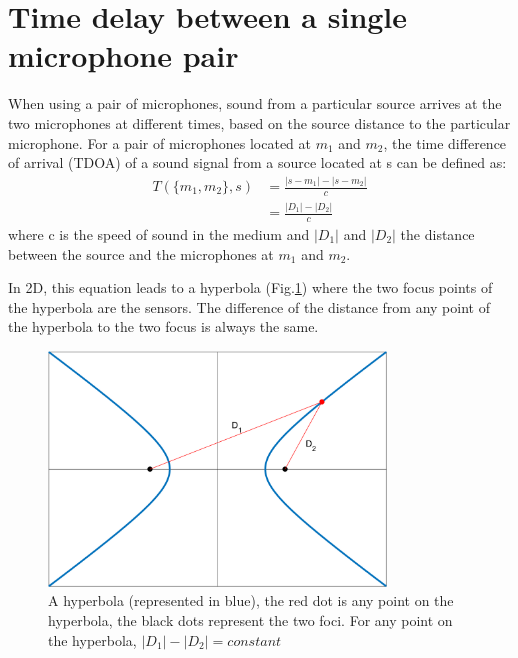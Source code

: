 \section{Time delay between a single microphone pair}\label{sec:TDOA}

When using a pair of microphones, sound from a particular source arrives at the two microphones at different times, based on the source distance to the particular microphone. For a pair of microphones located at $m_{1}$ and $m_{2}$, the time difference of arrival (TDOA) of a sound signal from a source located at s can be defined as:
\begin{equation}
    \begin{split}
    T(\{m_{1},m_{2}\},s)&=\frac{|s-m_{1}|-|s-m_{2}|}{c}\\
                        &=\frac{|D_{1}|-|D_{2}|}{c}
    \label{eq:tdoa}
    \end{split}
\end{equation}
where c is the speed of sound in the medium and $|D_{1}|$ and $|D_{2}|$ the distance between the source and the microphones at $m_1$ and $m_2$.

In 2D, this equation leads to a hyperbola (Fig.\ref{eq:tdoa}) where the two focus points of the hyperbola are the sensors. The difference of the distance from any point of the hyperbola to the two focus is always the same.

\begin{figure}[H]
    \centering
    \includegraphics[width=0.8\textwidth]{Figures/hyperbola.png}
    \caption{A hyperbola (represented in blue), the red dot is any point on the hyperbola, the black dots represent the two foci. For any point on the hyperbola, $|D_1|-|D_2| = constant$}
    \label{eq:tdoa}
\end{figure}

